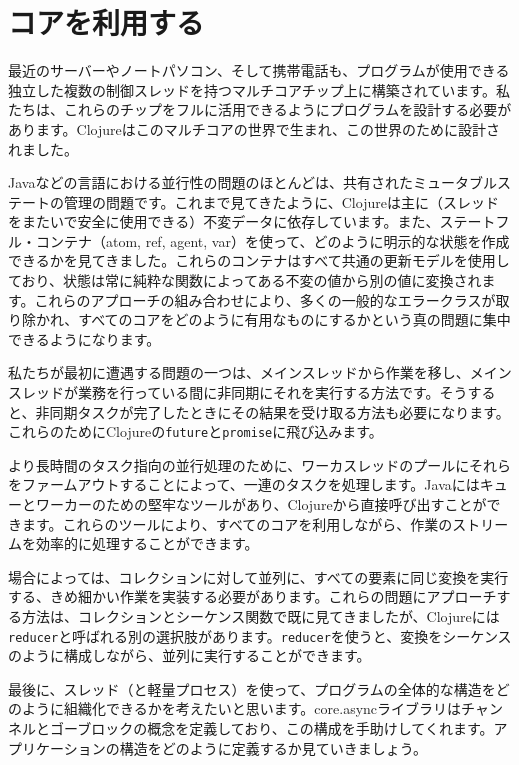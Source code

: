 \chapter{コアを利用する}


最近のサーバーやノートパソコン、そして携帯電話も、プログラムが使用できる独立した複数の制御スレッドを持つマルチコアチップ上に構築されています。私たちは、これらのチップをフルに活用できるようにプログラムを設計する必要があります。Clojureはこのマルチコアの世界で生まれ、この世界のために設計されました。

Javaなどの言語における並行性の問題のほとんどは、共有されたミュータブルステートの管理の問題です。これまで見てきたように、Clojureは主に（スレッドをまたいで安全に使用できる）不変データに依存しています。また、ステートフル・コンテナ（atom, ref, agent, var）を使って、どのように明示的な状態を作成できるかを見てきました。これらのコンテナはすべて共通の更新モデルを使用しており、状態は常に純粋な関数によってある不変の値から別の値に変換されます。これらのアプローチの組み合わせにより、多くの一般的なエラークラスが取り除かれ、すべてのコアをどのように有用なものにするかという真の問題に集中できるようになります。

私たちが最初に遭遇する問題の一つは、メインスレッドから作業を移し、メインスレッドが業務を行っている間に非同期にそれを実行する方法です。そうすると、非同期タスクが完了したときにその結果を受け取る方法も必要になります。これらのためにClojureの\texttt{future}と\texttt{promise}に飛び込みます。

より長時間のタスク指向の並行処理のために、ワーカスレッドのプールにそれらをファームアウトすることによって、一連のタスクを処理します。Javaにはキューとワーカーのための堅牢なツールがあり、Clojureから直接呼び出すことができます。これらのツールにより、すべてのコアを利用しながら、作業のストリームを効率的に処理することができます。

場合によっては、コレクションに対して並列に、すべての要素に同じ変換を実行する、きめ細かい作業を実装する必要があります。これらの問題にアプローチする方法は、コレクションとシーケンス関数で既に見てきましたが、Clojureには\texttt{reducer}と呼ばれる別の選択肢があります。\texttt{reducer}を使うと、変換をシーケンスのように構成しながら、並列に実行することができます。

最後に、スレッド（と軽量プロセス）を使って、プログラムの全体的な構造をどのように組織化できるかを考えたいと思います。core.asyncライブラリはチャンネルとゴーブロックの概念を定義しており、この構成を手助けしてくれます。アプリケーションの構造をどのように定義するか見ていきましょう。




